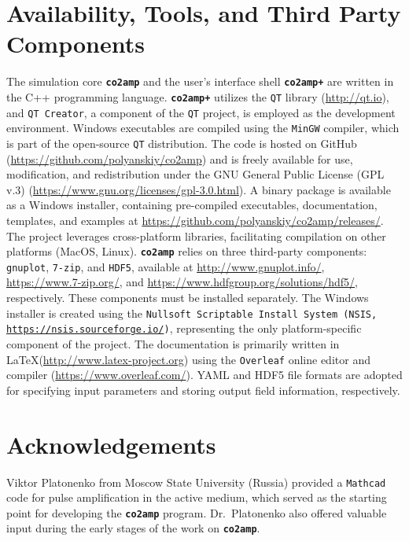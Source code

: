 \section{Availability, Tools, and Third Party Components}
The simulation core \textbf{\texttt{co2amp}} and the user's interface shell \textbf{\texttt{co2amp+}} are written in the C++ programming language. \textbf{\texttt{co2amp+}} utilizes the \texttt{QT} library (\url{http://qt.io}), and \texttt{QT Creator}, a component of the \texttt{QT} project, is employed as the development environment. Windows executables are compiled using the \texttt{MinGW} compiler, which is part of the open-source \texttt{QT} distribution. The code is hosted on GitHub (\url{https://github.com/polyanskiy/co2amp}) and is freely available for use, modification, and redistribution under the GNU General Public License (GPL v.3) (\url{https://www.gnu.org/licenses/gpl-3.0.html}). A binary package is available as a Windows installer, containing pre-compiled executables, documentation, templates, and examples at \url{https://github.com/polyanskiy/co2amp/releases/}. The project leverages cross-platform libraries, facilitating compilation on other platforms (MacOS, Linux). \textbf{\texttt{co2amp}} relies on three third-party components: \texttt{gnuplot}, \texttt{7-zip}, and \texttt{HDF5}, available at \url{http://www.gnuplot.info/}, \url{https://www.7-zip.org/}, and \url{https://www.hdfgroup.org/solutions/hdf5/}, respectively. These components must be installed separately. The Windows installer is created using the \texttt{Nullsoft Scriptable Install System (NSIS, \url{https://nsis.sourceforge.io/})}, representing the only platform-specific component of the project. The documentation is primarily written in \LaTeX (\url{http://www.latex-project.org}) using the \texttt{Overleaf} online editor and compiler (\url{https://www.overleaf.com/}). YAML and HDF5 file formats are adopted for specifying input parameters and storing output field information, respectively.



\section{Acknowledgements}
Viktor Platonenko from Moscow State University (Russia) provided a \texttt{Mathcad} code for pulse amplification in the  active medium, which served as the starting point for developing the \textbf{\texttt{co2amp}} program. Dr.~Platonenko also offered valuable input during the early stages of the work on \textbf{\texttt{co2amp}}.
